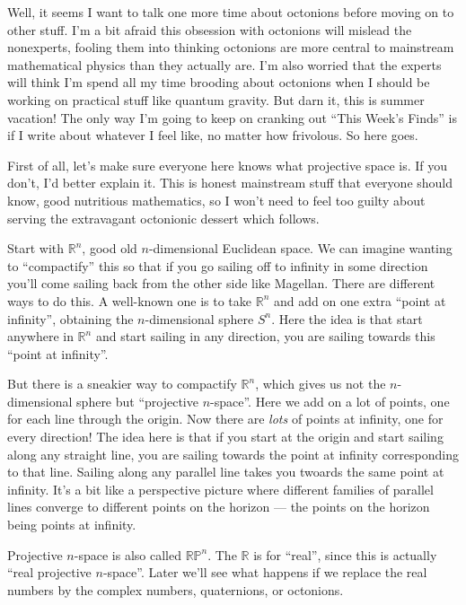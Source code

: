 \documentclass{article}
\begin{document}
Well, it seems I want to talk one more time about octonions before
moving on to other stuff. I'm a bit afraid this obsession with octonions
will mislead the nonexperts, fooling them into thinking octonions are
more central to mainstream mathematical physics than they actually are.
I'm also worried that the experts will think I'm spend all my time
brooding about octonions when I should be working on practical stuff
like quantum gravity. But darn it, this is summer vacation! The only way
I'm going to keep on cranking out ``This Week's Finds'' is if I write
about whatever I feel like, no matter how frivolous. So here goes.

First of all, let's make sure everyone here knows what projective space
is. If you don't, I'd better explain it. This is honest mainstream stuff
that everyone should know, good nutritious mathematics, so I won't need
to feel too guilty about serving the extravagant octonionic dessert
which follows.

Start with \(\mathbb{R}^n\), good old \(n\)-dimensional Euclidean space.
We can imagine wanting to ``compactify'' this so that if you go sailing
off to infinity in some direction you'll come sailing back from the
other side like Magellan. There are different ways to do this. A
well-known one is to take \(\mathbb{R}^n\) and add on one extra ``point
at infinity'', obtaining the \(n\)-dimensional sphere \(S^n\). Here the
idea is that start anywhere in \(\mathbb{R}^n\) and start sailing in any
direction, you are sailing towards this ``point at infinity''.

But there is a sneakier way to compactify \(\mathbb{R}^n\), which gives
us not the \(n\)-dimensional sphere but ``projective \(n\)-space''. Here
we add on a lot of points, one for each line through the origin. Now
there are \emph{lots} of points at infinity, one for every direction!
The idea here is that if you start at the origin and start sailing along
any straight line, you are sailing towards the point at infinity
corresponding to that line. Sailing along any parallel line takes you
twoards the same point at infinity. It's a bit like a perspective
picture where different families of parallel lines converge to different
points on the horizon --- the points on the horizon being points at
infinity.

Projective \(n\)-space is also called \(\mathbb{RP}^n\). The
\(\mathbb{R}\) is for ``real'', since this is actually ``real projective
\(n\)-space''. Later we'll see what happens if we replace the real
numbers by the complex numbers, quaternions, or octonions.
\end{document}
